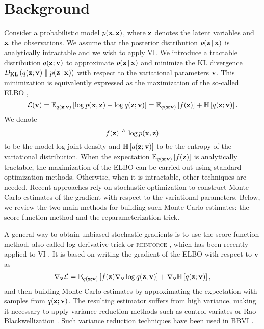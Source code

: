 \vspace*{-7pt}
\section{Background}
\vspace*{-5pt}
\label{sec:background}

Consider a probabilistic model $p(\mathbf{x},\mathbf{z})$, where $\mathbf{z}$ denotes the latent variables and 
$\mathbf{x}$ the observations. We assume that the posterior distribution $p(\mathbf{z}\, | \,\mathbf{x})$ is analytically intractable
and we wish to apply \gls{VI}. We introduce a
tractable distribution $q(\mathbf{z};\mathbf{v})$ to approximate $p(\mathbf{z}\, | \,\mathbf{x})$ and minimize the \gls{KL} divergence $D_{\textrm{KL}}\left(q(\mathbf{z};\mathbf{v})\;\|\;p(\mathbf{z}\, | \, \mathbf{x})\right)$ with respect to the variational parameters $\mathbf{v}$. This minimization is equivalently expressed as the maximization of the so-called \gls{ELBO} \citep{Jordan1999},
\begin{equation}\label{eq:elbo}
	\mathcal{L}(\mathbf{v}) = \mathbb{E}_{q(\mathbf{z};\mathbf{v})}\left[\log p(\mathbf{x},\mathbf{z})-\log q(\mathbf{z};\mathbf{v})\right] = \mathbb{E}_{q(\mathbf{z};\mathbf{v})}\left[f(\mathbf{z})\right] + \mathbb{H}\left[q(\mathbf{z};\mathbf{v})\right].
\end{equation}
We denote
\begin{equation}
	f(\mathbf{z})\triangleq\log p(\mathbf{x},\mathbf{z})
\end{equation}
to be the model log-joint density and $\mathbb{H}\left[q(\mathbf{z};\mathbf{v})\right]$ to be the entropy of the variational distribution.
When the expectation $\mathbb{E}_{q(\mathbf{z};\mathbf{v})}\left[f(\mathbf{z})\right]$ is analytically tractable, the maximization 
of the \gls{ELBO} can be carried out using standard optimization methods. Otherwise, when it is intractable, other techniques are needed. Recent approaches rely on stochastic optimization to construct Monte Carlo estimates of the gradient with respect to the variational parameters. Below, we review the two main methods for building such Monte Carlo estimates: the score function method and the reparameterization trick. 

 A general way to obtain unbiased stochastic gradients is to use the 
score function method, also called log-derivative trick or \textsc{reinforce} \citep{Williams1992,Glynn1990}, which has been recently applied to \gls{VI} \citep{Paisley2012,Ranganath2014,Mnih2014}. It is based on writing the gradient of the \gls{ELBO} with respect to $\mathbf{v}$ as
\begin{equation}\label{eq:reinforce}
	\nabla_{\mathbf{v}}\mathcal{L} = \mathbb{E}_{q(\mathbf{z};\mathbf{v})}\left[f(\mathbf{z}) \nabla_{\mathbf{v}}\log q(\mathbf{z};\mathbf{v})\right] + \nabla_{\mathbf{v}}\mathbb{H}\left[q(\mathbf{z};\mathbf{v})\right],
\end{equation}
and then building Monte Carlo estimates by approximating the expectation with samples from $q(\mathbf{z};\mathbf{v})$. 
The resulting estimator suffers from high variance, making it necessary to apply variance reduction methods such as control variates \citep{Ross2002} or Rao-Blackwellization \citep{Casella1996}. Such variance reduction techniques have been used in \gls{BBVI} \citep{Ranganath2014}.  


